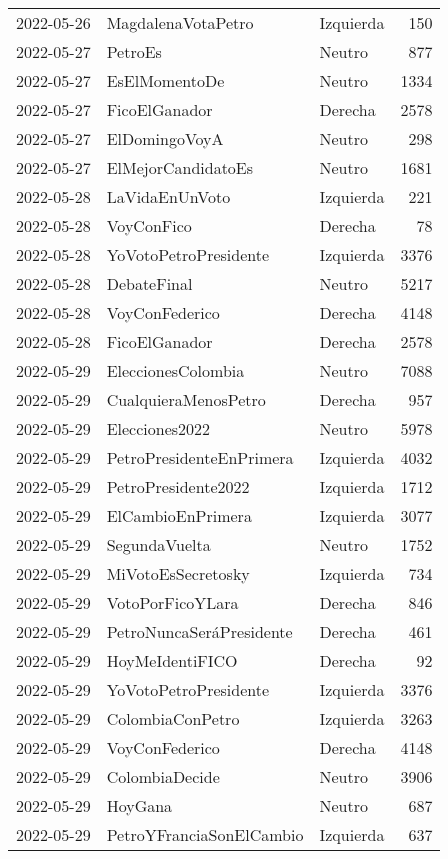 \begin{longtable}{lllr}
2022-05-26 & MagdalenaVotaPetro & Izquierda & 150 \\
2022-05-27 & PetroEs & Neutro & 877 \\
2022-05-27 & EsElMomentoDe & Neutro & 1334 \\
2022-05-27 & FicoElGanador & Derecha & 2578 \\
2022-05-27 & ElDomingoVoyA & Neutro & 298 \\
2022-05-27 & ElMejorCandidatoEs & Neutro & 1681 \\
2022-05-28 & LaVidaEnUnVoto & Izquierda & 221 \\
2022-05-28 & VoyConFico & Derecha & 78 \\
2022-05-28 & YoVotoPetroPresidente & Izquierda & 3376 \\
2022-05-28 & DebateFinal & Neutro & 5217 \\
2022-05-28 & VoyConFederico & Derecha & 4148 \\
2022-05-28 & FicoElGanador & Derecha & 2578 \\
2022-05-29 & EleccionesColombia & Neutro & 7088 \\
2022-05-29 & CualquieraMenosPetro & Derecha & 957 \\
2022-05-29 & Elecciones2022 & Neutro & 5978 \\
2022-05-29 & PetroPresidenteEnPrimera & Izquierda & 4032 \\
2022-05-29 & PetroPresidente2022 & Izquierda & 1712 \\
2022-05-29 & ElCambioEnPrimera & Izquierda & 3077 \\
2022-05-29 & SegundaVuelta & Neutro & 1752 \\
2022-05-29 & MiVotoEsSecretosky & Izquierda & 734 \\
2022-05-29 & VotoPorFicoYLara & Derecha & 846 \\
2022-05-29 & PetroNuncaSeráPresidente & Derecha & 461 \\
2022-05-29 & HoyMeIdentiFICO & Derecha & 92 \\
2022-05-29 & YoVotoPetroPresidente & Izquierda & 3376 \\
2022-05-29 & ColombiaConPetro & Izquierda & 3263 \\
2022-05-29 & VoyConFederico & Derecha & 4148 \\
2022-05-29 & ColombiaDecide & Neutro & 3906 \\
2022-05-29 & HoyGana & Neutro & 687 \\
2022-05-29 & PetroYFranciaSonElCambio & Izquierda & 637 \\

\end{longtable}
